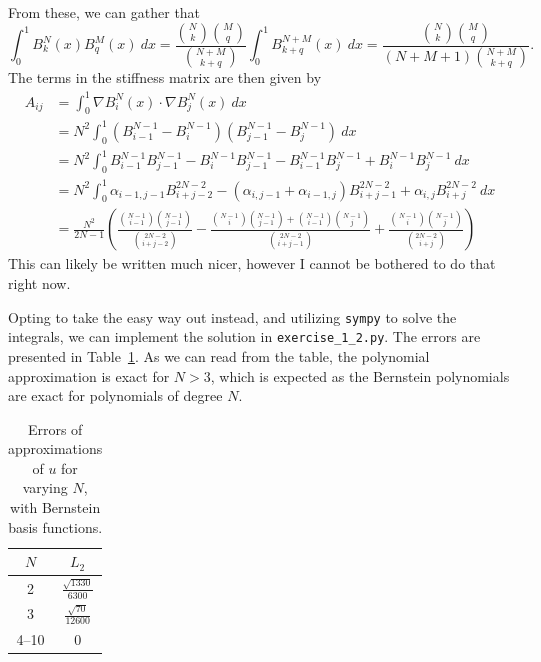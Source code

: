 \begin{solution}
    From these, we can gather that
    \begin{equation*}
        \int_{0}^{1} B_k^N(x) B_q^M(x) \ dx = \frac{\binom{N}{k}\binom{M}{q}}{\binom{N + M}{k + q}} \int_0^1 B_{k+q}^{N + M}(x) \ dx = \frac{\binom{N}{k}\binom{M}{q}}{(N + M + 1) \binom{N + M}{k + q}}.
    \end{equation*}
    The terms in the stiffness matrix are then given by
    \begin{align*}
        A_{ij} &= \int_{0}^{1} \nabla B_i^N(x) \cdot \nabla B_{j}^N(x) \ dx \\
        &= N^2 \int_{0}^{1} \left( B_{i-1}^{N - 1} - B_{i}^{N - 1} \right) \left( B_{j-1}^{N - 1} - B_{j}^{N - 1} \right) \ dx \\
        &= N^2
        \int_{0}^{1} B_{i-1}^{N - 1} B_{j-1}^{N - 1}
        - B_{i}^{N - 1} B_{j-1}^{N - 1}
        - B_{i-1}^{N - 1} B_{j}^{N - 1}
        + B_{i}^{N - 1} B_{j}^{N - 1} \ dx
        \\
        &= N^2 \int_{0}^{1} \alpha_{i-1, j-1} B_{i+j-2}^{2N-2} - (\alpha_{i,j-1} + \alpha_{i-1, j}) B_{i+j-1}^{2N - 2} + \alpha_{i,j} B_{i+j}^{2N - 2} \ dx \\
        &= \frac{N^2}{2N - 1} \left(
            \frac{\binom{N-1}{i-1}\binom{N-1}{j-1}}{\binom{2N - 2}{i + j - 2}}
            - \frac{
                \binom{N-1}{i}\binom{N-1}{j-1}
                + \binom{N-1}{i-1}\binom{N-1}{j}
            }{\binom{2N - 2}{i + j - 1}}
            + \frac{\binom{N-1}{i}\binom{N-1}{j}}{\binom{2N - 2}{i + j}}
        \right)
    \end{align*}
    This can likely be written much nicer, however I cannot be bothered to do that right now.

    Opting to take the easy way out instead, and utilizing \verb|sympy| to solve the integrals, we can implement the solution in \verb|exercise_1_2.py|.
    The errors are presented in Table~\ref{tab:1_2}.
    As we can read from the table, the polynomial approximation is exact for $N > 3$, which is expected as the Bernstein polynomials are exact for polynomials of degree $N$.

    \begin{table}[!h]
        \centering
        \caption{Errors of approximations of $u$ for varying $N$, with Bernstein basis functions.\label{tab:1_2}}
        \begin{tabular}{cc}
            \toprule
            $N$ & $L_2$ \\
            \midrule
            2 & $\frac{\sqrt{1330}}{6300}$ \\
            3 & $\frac{\sqrt{70}}{12600}$ \\
            4--10 & 0 \\
            \bottomrule
        \end{tabular}
    \end{table}
\end{solution}

